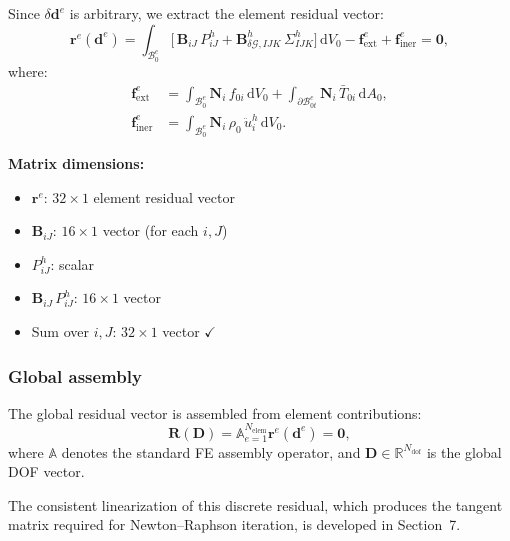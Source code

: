\documentclass[11pt]{article}
\begin{document}
Since $\delta\mathbf{d}^{e}$ is arbitrary, we extract the element
residual vector:
\begin{equation}
\boxed{
\mathbf{r}^{e}(\mathbf{d}^{e})
= \int_{\mathcal{B}_{0}^{e}}
  \bigl[\,\mathbf{B}_{iJ}\,P_{iJ}^{h}
  + \mathbf{B}_{\delta\mathcal{G},IJK}^{h}\,\Sigma_{IJK}^{h}
  \bigr]\,\mathrm{d}V_{0}
- \mathbf{f}_{\mathrm{ext}}^{e}
+ \mathbf{f}_{\mathrm{iner}}^{e}
= \mathbf{0},
}
\label{s6:residual_elem}
\end{equation}
where:
\begin{align}
\mathbf{f}_{\mathrm{ext}}^{e}
&= \int_{\mathcal{B}_{0}^{e}} \mathbf{N}_{i}\,f_{0i}\,\mathrm{d}V_{0}
 + \int_{\partial\mathcal{B}_{0t}^{e}} \mathbf{N}_{i}\,\bar{T}_{0i}\,\mathrm{d}A_{0},
\label{s6:f_ext}\\
\mathbf{f}_{\mathrm{iner}}^{e}
&= \int_{\mathcal{B}_{0}^{e}} \mathbf{N}_{i}\,\rho_{0}\,\ddot{u}_{i}^{h}\,\mathrm{d}V_{0}.
\label{s6:f_iner}
\end{align}

\textbf{Matrix dimensions:}
\begin{itemize}
\item $\mathbf{r}^{e}$: $32\times 1$ element residual vector
\item $\mathbf{B}_{iJ}$: $16\times 1$ vector (for each $i,J$)
\item $P_{iJ}^{h}$: scalar
\item $\mathbf{B}_{iJ}\,P_{iJ}^{h}$: $16\times 1$ vector
\item Sum over $i,J$: $32\times 1$ vector $\checkmark$
\end{itemize}

\subsubsection{Global assembly}

The global residual vector is assembled from element contributions:
\begin{equation}
\boxed{
\mathbf{R}(\mathbf{D})
= \mathbb{A}_{e=1}^{N_{\mathrm{elem}}} \mathbf{r}^{e}(\mathbf{d}^{e})
= \mathbf{0},
}
\label{s6:residual_global}
\end{equation}
where $\mathbb{A}$ denotes the standard FE assembly operator, and
$\mathbf{D}\in\mathbb{R}^{N_{\mathrm{dof}}}$ is the global DOF vector.

The consistent linearization of this discrete residual, which produces the tangent matrix required for Newton--Raphson iteration, is developed in Section~7.
\end{document}
